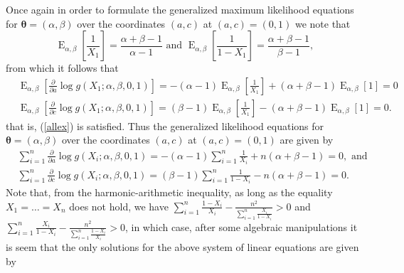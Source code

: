 \documentclass[10pt,a4paper,onecolumn]{article} %
\newcommand{\bs}{\boldsymbol}
\newcommand{\on}{\operatorname}
\begin{document}
Once again in order to formulate the generalized maximum likelihood equations for $\bs{\theta}=(\alpha,\beta)$ over the coordinates $(a,c)$ at $(a,c)=(0,1)$ we note that
\begin{equation}\label{relations2}\on{E}_{\alpha,\beta}\left[\frac{1}{X_1}\right]=\frac{\alpha+\beta-1}{\alpha-1}\mbox{ and }\on{E}_{\alpha,\beta}\left[\frac{1}{1-X_1}\right]=\frac{\alpha+\beta-1}{\beta-1},
\end{equation}
from which it follows that
\begin{equation*}
\begin{aligned}
&\on{E}_{\alpha,\beta} \left[\frac{\partial}{\partial a}  \log g(X_1;\alpha,\beta,0,1)\right] = -(\alpha-1) \on{E}_{\alpha,\beta}\left[\frac{1}{X_1}\right] + (\alpha+\beta-1) \on{E}_{\alpha,\beta}\left[1\right]=0\\
&\on{E}_{\alpha,\beta} \left[\frac{\partial}{\partial c}  \log g(X_1;\alpha,\beta,0,1)\right] =(\beta-1) \on{E}_{\alpha,\beta}\left[\frac{1}{X_1}\right] - (\alpha+\beta-1) \on{E}_{\alpha,\beta}\left[1\right]=0.
\end{aligned}
\end{equation*}
that is, (\ref{allex}) is satisfied. Thus  the generalized likelihood equations for $\bs{\theta}=(\alpha,\beta)$ over the coordinates $(a,c)$ at $(a,c)=(0,1)$ are given by
\begin{equation*}
\begin{aligned}
&\sum_{i=1}^n \frac{\partial}{\partial a}  \log g(X_i;\alpha,\beta,0,1)=-(\alpha -1)\sum _{i=1}^{n}{\frac {1}{X_{i}}}+n(\alpha +\beta -1)=0,\mbox{ and }\\
&\sum_{i=1}^n \frac{\partial}{\partial c}  \log g(X_i;\alpha,\beta,0,1)=(\beta-1)\sum _{i=1}^{n}{\frac {1}{1-X_{i}}}-n(\alpha +\beta -1)=0.
\end{aligned}
\end{equation*}
Note that, from the harmonic-arithmetic inequality, as long as the equality $X_1=\ldots=X_n$ does not hold, we have $\sum_{i=1}^{n}\frac{1-X_i}{X_i}-\frac{n^2}{\sum_{i=1}^{n}\frac{X_i}{1-X_i}}>0$ and $\sum_{i=1}^{n}\frac{X_i}{1-X_i}-\frac{n^2}{\sum_{i=1}^{n}\frac{1-X_i}{X_i}}>0$, in which case, after some algebraic manipulations it is seem that the only solutions for the above system of linear equations are given by
\end{document}
